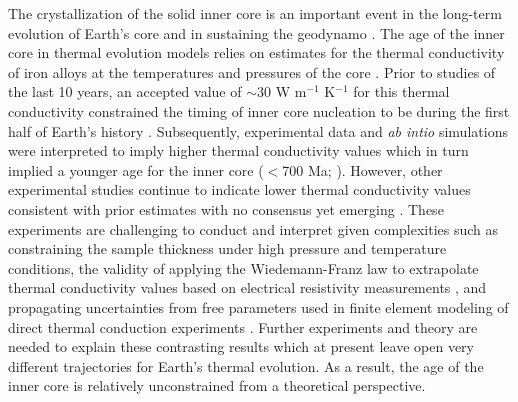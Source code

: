 The crystallization of the solid inner core is an important event in the long-term evolution of Earth's core and in sustaining the geodynamo \citep{Buffett2000a}. The age of the inner core in thermal evolution models relies on estimates for the thermal conductivity of iron alloys at the temperatures and pressures of the core \citep{Ohta2021a}. Prior to studies of the last 10 years, an accepted value of $\sim$30 W m$^{-1}$ K$^{-1}$ for this thermal conductivity constrained the timing of inner core nucleation to be during the first half of Earth's history \citep{Stacey2007a, Konopkova2016a}. Subsequently, experimental data and \textit{ab intio} simulations were interpreted to imply higher thermal conductivity values \citep{Pozzo2012a, Ohta2016a} which in turn implied a younger age for the inner core ($<$700 Ma; \citealp{Labrosse2015a}). However, other experimental studies continue to indicate lower thermal conductivity values consistent with prior estimates \citep{Konopkova2016a, Hsieh2020a} with no consensus yet emerging \citep{Williams2018a, Ohta2021a}. These experiments are challenging to conduct and interpret given complexities such as constraining the sample thickness under high pressure and temperature conditions, the validity of applying the Wiedemann-Franz law to extrapolate thermal conductivity values based on electrical resistivity measurements \citep{Ohta2016a}, and propagating uncertainties from free parameters used in finite element modeling of direct thermal conduction experiments \citep{Konopkova2016a}. Further experiments and theory are needed to explain these contrasting results which at present leave open very different trajectories for Earth's thermal evolution. As a result, the age of the inner core is relatively unconstrained from a theoretical perspective. 

